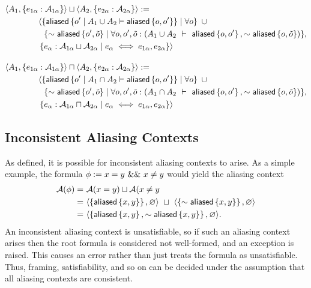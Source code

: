 \begin{align*}
&
\context{A_1}{\set{e_{1\alpha} : \A_{1\alpha}}} \contextunion
\context{A_2}{\set{e_{2\alpha} : \A_{2\alpha}}} :=
\\ & \hspace{4em}
\langle
  \set{
    \aliased\set{ o\p \mid A_1 \cup A_2 \entails \aliased\set{o,o\p} }
    \mid
    \forall o
  } \ \cup
\\ & \hspace{4em} \ \
  \{
    \pnot \aliased\set{o\p, \tilde o}
    \mid
    \forall o, o\p, \tilde o :
    (A_1 \cup A_2 \ \entails \ \aliased\set{o, o\p}, \pnot \aliased\set{o, \tilde o})
  \},
\\ & \hspace{4em}
    \set{ e_\alpha : \A_{1\alpha} \contextunion \A_{2\alpha} \mid
    e_\alpha \iff e_{1\alpha}, e_{2\alpha} }
\rangle
%
\\[1em]
%
&
\context{A_1}{\set{e_{1\alpha} : \A_{1\alpha}}} \contextintersection
\context{A_2}{\set{e_{2\alpha} : \A_{2\alpha}}} :=
\\ & \hspace{4em}
\langle
  \set{
    \aliased\set{ o\p \mid A_1 \cap A_2 \entails \aliased\set{o,o\p} }
    \mid
    \forall o
  } \ \cup
\\ & \hspace{4em} \ \
  \{
    \pnot \aliased\set{o\p, \tilde o}
    \mid
    \forall o, o\p, \tilde o :
    (A_1 \cap A_2 \ \entails \ \aliased\set{o, o\p}, \pnot \aliased\set{o, \tilde o})
  \},
\\ & \hspace{4em}
    \set{ e_\alpha : \A_{1\alpha} \contextintersection \A_{2\alpha} \mid
    e_\alpha \iff e_{1\alpha}, e_{2\alpha} }
\rangle
\end{align*}

\subsection{Inconsistent Aliasing Contexts}

As defined, it is possible for inconsistent aliasing contexts to arise. As a simple example, the formula $\phi := x = y \ \&\& \ x \neq y$ would yield the aliasing context
\begin{align*}
  \mathcal{A}(\phi) = & \
  \mathcal{A}(x = y) \sqcup \mathcal{A}(x \neq y \\ = & \
  \langle \left\{  \textsf{aliased}\left\{ x,y \right\}  \right\}, \varnothing \rangle \ \sqcup \
  \langle \left\{  \sim \textsf{aliased}\left\{ x,y \right\}  \right\}, \varnothing \rangle \\ = & \
  \langle \left\{  \textsf{aliased}\left\{ x,y \right\}, \sim \textsf{aliased}\left\{ x,y \right\}  \right\}, \varnothing \rangle.
\end{align*}
An inconsistent aliasing context is unsatisfiable, so if such an aliasing context arises then the root formula is considered not well-formed, and an  exception is raised. This causes an error rather than just treats the formula as unsatisfiable. Thus, framing, satisfiability, and so on can be decided under the assumption that all aliasing contexts are consistent.

